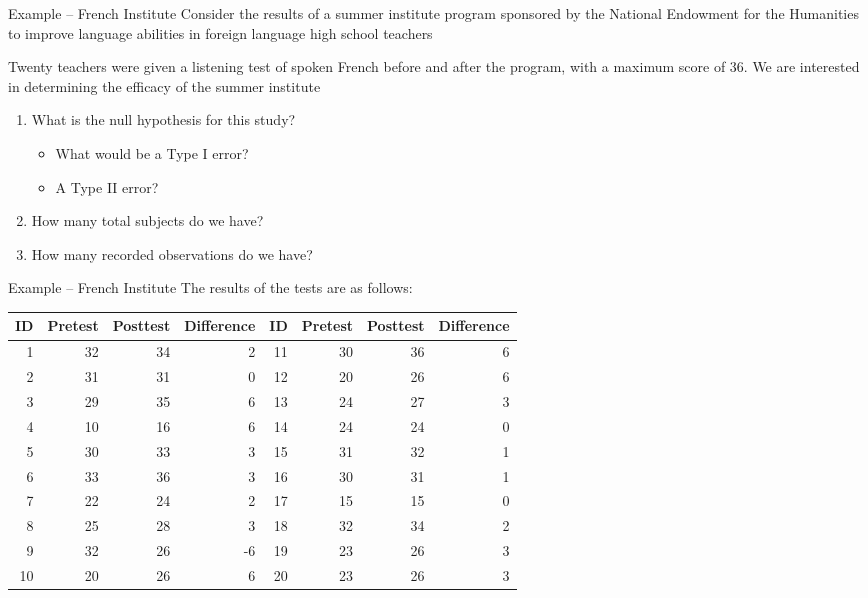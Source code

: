 \documentclass{beamer}
\begin{document}
\begin{frame}{Example -- French Institute}
Consider the results of a summer institute program sponsored by the National Endowment for the Humanities to improve language abilities in foreign language high school teachers \vspace{4mm}

Twenty teachers were given a listening test of spoken French before and after the program, with a maximum score of 36. We are interested in determining the efficacy of the summer institute \vspace{10mm}

\begin{enumerate}
\item What is the null hypothesis for this study?
\begin{itemize}
\item What would be a Type I error?
\item A Type II error?
\end{itemize}
\item How many total subjects do we have?
\item How many recorded observations do we have?
\end{enumerate}
\end{frame}


\begin{frame}{Example -- French Institute}
\small
The results of the tests are as follows:
\begin{table}[ht]
\centering
\begin{tabular}{rrrr||rrrr}
  \hline
ID & Pretest & Posttest & Difference & ID & Pretest & Posttest & Difference \\ 
  \hline
1 & 32 & 34 & 2 & 11 & 30 & 36 & 6 \\ 
  2 & 31 & 31 & 0 & 12 & 20 & 26 & 6 \\ 
  3 & 29 & 35 & 6 & 13 & 24 & 27 & 3 \\ 
  4 & 10 & 16 & 6 & 14 & 24 & 24 & 0 \\ 
  5 & 30 & 33 & 3 & 15 & 31 & 32 & 1 \\ 
  6 & 33 & 36 & 3 & 16 & 30 & 31 & 1 \\ 
  7 & 22 & 24 & 2 & 17 & 15 & 15 & 0 \\ 
  8 & 25 & 28 & 3 & 18 & 32 & 34 & 2 \\ 
  9 & 32 & 26 & -6 & 19 & 23 & 26 & 3 \\ 
  10 & 20 & 26 & 6 & 20 & 23 & 26 & 3 \\ 
   \hline
\end{tabular}
\end{table}
\end{frame}
\end{document}
